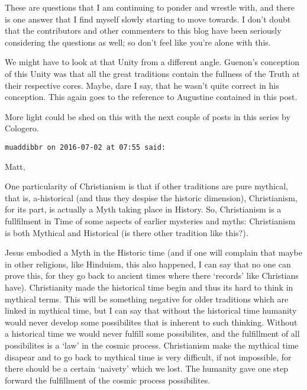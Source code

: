 \begin{footnotesize}
\begin{sffamily}
These are questions that I am continuing to ponder and wrestle with, and there is one answer that I find myself slowly starting to move towards. I don't doubt that the contributors and other commenters to this blog have been seriously considering the questions as well; so don't feel like you're alone with this.

We might have to look at that Unity from a different angle. Guenon's conception of this Unity was that all the great traditions contain the fullness of the Truth at their respective cores. Maybe, dare I say, that he wasn't quite correct in his conception. This again goes to the reference to Augustine contained in this post.

More light could be shed on this with the next couple of posts in this series by Cologero.


\hfill

\texttt{muaddibbr on 2016-07-02 at 07:55 said: }

Matt,

One particularity of Christianism is that if other traditions are pure mythical, that is, a-historical (and thus they despise the historic dimension), Christianism, for its part, is actually a Myth taking place in History. So, Christianism is a fullfilment in Time of some aspects of earlier mysteries and myths: Christianism is both Mythical and Historical (is there other tradition like this?). 

Jesus embodied a Myth in the Historic time (and if one will complain that maybe in other religions, like Hinduism, this also happened, I can say that no one can prove this, for they go back to ancient times where there `records' like Christians have). Christianity made the historical time begin and thus its hard to think in mythical terms. This will be something negative for older traditions which are linked in mythical time, but I can say that without the historical time humanity would never develop some possibilites that is inherent to such thinking. Without a historical time we would never fulfill some possibilites, and the fulfillment of all possibilites is a `law' in the cosmic process. Christianism make the mythical time disapear and to go back to mythical time is very difficult, if not impossible, for there should be a certain `naivety' which we lost. The humanity gave one step forward the fulfillment of the cosmic process possibilites. 


\end{sffamily}
\end{footnotesize}
